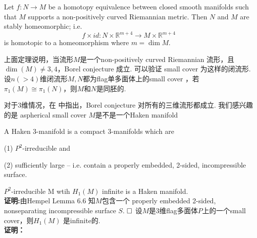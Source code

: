 \documentclass{article}
\theoremstyle{plain}%
\theoremstyle{definition}
\theoremstyle{remark}
\begin{document}
{\thm [\cite{F1}] Let $f:N\longrightarrow M$ be a homotopy equivalence between closed smooth manifolds such that $M$ supports a non-positively curved Riemannian metric. Then $N$ and $M$ are stably homeomorphic; i.e.
\begin{equation}\label{eq8}
f\times id :N\times \mathbb{R}^{m+4}\longrightarrow M\times \mathbb{R}^{m+4}
\end{equation}
is homotopic to a homeomorphism where $m=\dim{M}$.}

上面定理说明，当流形$M$是一个non-positively curved Riemannian 流形，且$\dim (M)\neq 3,4$，Borel conjecture 成立. 可以验证 small cover 为这样的闭流形. 
{\cor 设$n(>4)$维闭流形$M,N$都为flag单多面体上的small cover ，若$\pi_1(M)\cong \pi_1(N)$，则$M$和$N$是同胚的.
}

对于$3$维情况，在\cite{AFW} 中指出，Borel conjecture 对所有的三维流形都成立. 我们感兴趣的是 aspherical small cover $M$是不是一个Haken manifold



{ 
A {Haken $3$-manifold} is a compact $3$-manifolds which are

\item[(1)]  $P^2$-irreducible and

\item[(2)] sufficiently large -- i.e. contain a properly embedded, 2-sided, incompressible surface.
}
{\prop  $P^2$-irreducible M wtih $H_1(M)$ infinite is a Haken manifold.}\\
{\bf 证明:}由Hempel \cite{He1} Lemma 6.6 知$M$包含一个 properly embedded 2-sided, nonseparating incompressible surface $S$. $\hfill{} \Box$
{\lem[*待证] 设$M$是$3$维flag多面体$P$上的一个small cover，则$H_1(M)$ 是infinite的.}\\
{\bf 证明：}
\end{document}
